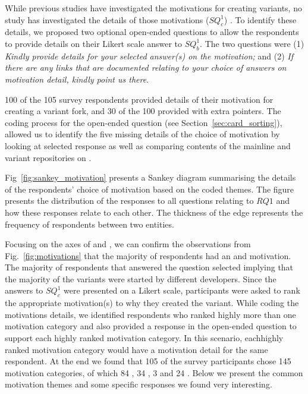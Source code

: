 While previous studies have investigated the motivations for creating variants, no study has investigated the details of those motivations ($SQ^1_{c}$) .
To identify these details, we proposed two optional open-ended questions to allow the respondents to provide details on their Likert scale answer to $SQ^1_{b}$. The two questions were
(1) \emph{Kindly provide details for your selected answer(s) on the motivation;}
and (2) \emph{If there are any links that are documented relating to your choice of answers on motivation detail, kindly point us there}.

100 of the 105 survey respondents  provided details of their motivation for creating a variant fork, and 30 of the 100 provided with extra pointers.
The coding process for the open-ended question (see Section~\ref{sec:card_sorting}), allowed us to identify the five missing details of the choice of motivation by looking at selected response as well as comparing contents of the mainline and variant repositories on \gh.

Fig~\ref{fig:sankey_motivation} presents a Sankey diagram summarising the details of the respondents' choice of motivation based on the coded themes. 
The figure  presents the distribution of the responses to all questions relating to $RQ1$ and how these responses relate to each other. The thickness of the edge represents the frequency of respondents between two entities.

Focusing on the axes of  and , we can confirm the observations from Fig.~\ref{fig:motivations} that the majority of respondents had an  and  motivation.
The majority of respondents that answered the question  selected  implying that the majority of the variants were started by different developers.
Since the answers to $SQ^1_{c}$ were presented on a Likert scale, participants were asked to rank the appropriate motivation(s) to why they created the variant. While coding the motivations details, we identified respondents who ranked highly more than one motivation category and also provided a response in the open-ended question to support each highly ranked motivation category. In this scenario, eachhighly ranked motivation category would have a motivation detail for the same respondent. %
At the end we found that 105 of the survey participants chose 145 motivation categories, of which 84 , 34 , 3  and 24 . Below we present the common motivation themes and some  specific responses we found very
interesting.


